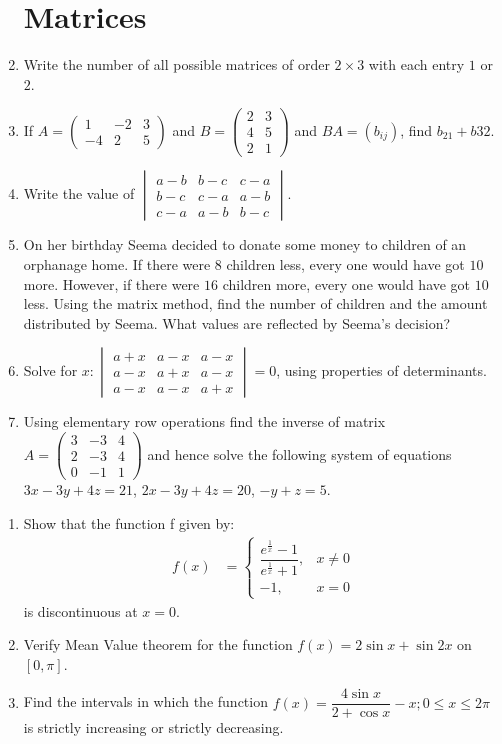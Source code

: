 \documentclass[12pt,-letter paper]{article}
\newcommand{\myvec}[1]{\ensuremath{\begin{pmatrix}#1\end{pmatrix}}}
\newcommand{\mydet}[1]{\ensuremath{\begin{vmatrix}#1\end{vmatrix}}}
\providecommand{\brak}[1]{\ensuremath{\left(#1\right)}}
\providecommand{\sbrak}[1]{\ensuremath{\left[#1\right]}}
\begin{document}
\begin{enumerate}
\section*{Matrices}
\item Write the number of all possible matrices of order $2 \times 3$ with each entry $1$ or $2$.
\item If $A = \myvec{1 & -2 & 3 \\ -4 & 2 & 5}$ and $B = \myvec{2 & 3 \\ 4 & 5 \\ 2 & 1}$ and $BA = \brak{b_{ij}}$, find $b_{21} + b{32}$.
\item Write the value of $\mydet{{a-b} & {b-c} & {c-a} \\ {b-c} & {c-a} & {a-b}\\ {c-a} & {a-b} & {b-c}}$.
\item On her birthday Seema decided to donate some money to children of an orphanage home. If there were $8$ children less, every one would have got \rupee$10$ more. However, if there were $16$ children more, every one would have got \rupee$10$ less. Using the matrix method, find the number of children and the amount distributed by Seema. What values are reflected by Seema's decision?
\item Solve for $x : \mydet{a+x & a-x & a-x \\ a-x & a+x & a-x \\ a-x & a-x & a+x} = 0$, using properties of determinants.
\item Using elementary row operations find the inverse of matrix $A = \myvec{3 & -3 & 4 \\ 2 & -3 & 4\\ 0 & -1 & 1}$ and hence solve the following system of equations $ 3x - 3y + 4z = 21$, $2x - 3y + 4z = 20$, $-y + z = 5$.
\end{enumerate}

\begin{enumerate}
\section*{Functions and Relations}
\item Show that the function f given by:
\begin{align*}
f\brak{x} &= \begin{cases}
	\dfrac{e^{\frac{1}{x}} - 1}{e^{\frac{1}{x}} + 1}, & x \neq 0\\
	-1 , & x = 0
	\end{cases}
\end{align*}
is discontinuous at $x=0$.
\item Verify Mean Value theorem for the function $f\brak{x} = 2\sin{x} + \sin{2x}$ on $\sbrak{0,\pi}$.
\item Find the intervals in which the function $f\brak{x} = \dfrac{4\sin x}{2 + \cos x} - x; 0 \leq x \leq 2\pi$ is strictly increasing or strictly decreasing.
\end{enumerate}
\end{document}
